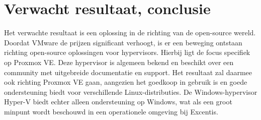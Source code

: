 




\section{Verwacht resultaat, conclusie}%
\label{sec:verwachte_resultaten}

Het verwachte resultaat is een oplossing in de richting van de open-source wereld. Doordat VMware de prijzen significant verhoogt, is er een beweging ontstaan richting open-source oplossingen voor hypervisors.
Hierbij ligt de focus specifiek op Proxmox VE. Deze hypervisor is algemeen bekend en beschikt over een community met uitgebreide documentatie en support.
Het resultaat zal daarmee ook richting Proxmox VE gaan, aangezien het goedkoop in gebruik is en goede ondersteuning biedt voor verschillende Linux-distributies.
De Windows-hypervisor Hyper-V biedt echter alleen ondersteuning op Windows, wat als een groot minpunt wordt beschouwd in een operationele omgeving bij Excentis.

